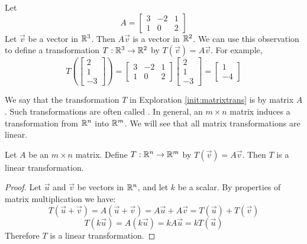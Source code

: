 \documentclass{ximera}
\begin{document}
\begin{exploration}\label{init:matrixtrans}   Let $$A=\begin{bmatrix}
3&-2&1\\
1&0&2
\end{bmatrix}$$
Let $\vec{v}$ be a vector in $\mathbb{R}^3$.  Then $A\vec{v}$ is a vector in $\mathbb{R}^2$.  We can use this observation to define a transformation $T:\mathbb{R}^3\rightarrow\mathbb{R}^2$ by $T(\vec{v})=A\vec{v}$.  For example,
$$T\left(\begin{bmatrix}
2\\
1\\
-3
\end{bmatrix}\right)=\begin{bmatrix}
3&-2&1\\
1&0&2
\end{bmatrix}\begin{bmatrix}
2\\
1\\
-3
\end{bmatrix}=\begin{bmatrix}
1\\
-4
\end{bmatrix}$$

\end{exploration}



We say that the transformation $T$ in Exploration \ref{init:matrixtrans} is  by matrix $A$.  Such transformations are often called .  In general, an $m\times n$ matrix induces a transformation from $\mathbb{R}^n$ into $\mathbb{R}^m$.  We will see that all matrix transformations are linear.


  \begin{theorem}\label{th:matrixtran} Let $A$ be an $m\times n$ matrix.  Define $T:\mathbb{R}^n\rightarrow\mathbb{R}^m$ by $T(\vec{v})=A\vec{v}$.  Then $T$ is a linear transformation.
\end{theorem}

\begin{proof}  Let $\vec{u}$ and $\vec{v}$ be vectors in $\mathbb{R}^n$, and let $k$ be a scalar.  By properties of matrix multiplication we have:
$$T(\vec{u}+\vec{v})=A(\vec{u}+\vec{v})=A\vec{u}+A\vec{v}=T(\vec{u})+T(\vec{v})$$
$$T(k\vec{u})=A(k\vec{u})=kA\vec{u}=kT(\vec{u})$$
Therefore $T$ is a linear transformation.
\end{proof}
\end{document}
